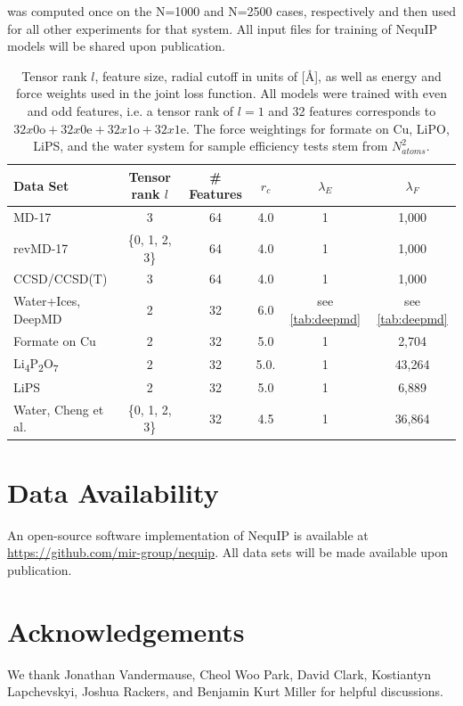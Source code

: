 \documentclass[%
reprint,
superscriptaddress,
nofootinbib,
amsmath,amssymb,
aps,
prl,
]{revtex4-1}
\begin{document}
was computed once on the N=1000  and N=2500 cases, respectively and then used for all other experiments for that system. All input files for training of NequIP models will be shared upon publication. 

\begin{table}[!htbp]
\centering
\begin{tabular}{lccccc}
\hline \hline
Data Set  & Tensor rank $l$ & \# Features &  $r_c$ & $\lambda_E$ & $\lambda_F$ \\
\hline
MD-17  & 3 & 64 & 4.0 &  1  & 1,000 \\
revMD-17   & \{0, 1, 2, 3\} & 64 & 4.0 &  1 & 1,000 \\
CCSD/CCSD(T)  & 3 &  64 & 4.0 &   1 & 1,000\\
Water+Ices, DeepMD  & 2 & 32  & 6.0 & see \ref{tab:deepmd} & see \ref{tab:deepmd}  \\ 
Formate on Cu  & 2 & 32 & 5.0 &  1 & 2,704 \\
Li\textsubscript{4}P\textsubscript{2}O\textsubscript{7}  & 2  & 32  & 5.0. & 1  & 43,264 \\
LiPS  &  2&32  & 5.0 & 1  & 6,889 \\
Water, Cheng et al. & \{0, 1, 2, 3\} & 32  & 4.5 & 1 &  36,864 \\
\hline \hline
\end{tabular}
\caption{Tensor rank $l$, feature size, radial cutoff in units of [\AA], as well as energy and force weights used in the joint loss function. All models were trained with even and odd features, i.e. a tensor rank of $l=1$ and 32 features corresponds to $32x0\mathrm{o} + 32x0\mathrm{e} + 32x1\mathrm{o} + 32x1\mathrm{e}$. The force weightings for formate on Cu, LiPO, LiPS, and the water system for sample efficiency tests stem from $N_{atoms}^2$. 
\label{tab:hyper}}
\end{table}

\section{Data Availability}

An open-source software implementation of NequIP is available at \url{https://github.com/mir-group/nequip}. All data sets will be made available upon publication. 



\section{Acknowledgements}
We thank Jonathan Vandermause, Cheol Woo Park, David Clark, Kostiantyn Lapchevskyi, Joshua Rackers, and Benjamin Kurt Miller for helpful discussions.\\ 
\end{document}
